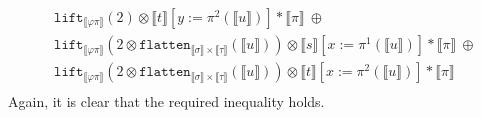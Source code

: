 \documentclass[a4paper,UKenglish,cleveref,autoref,numberwithinsect]{lipics-v2019}
\theoremstyle{definition}
\newcommand{\flatten}{\mathtt{flatten}}
\newcommand{\lift}{\mathtt{lift}}
\newcommand{\typeinterpret}[1]{\llbracket #1 \rrbracket}
\newcommand{\interpret}[1]{\llbracket #1 \rrbracket}
\begin{document}
\begin{itemize}
\[\begin{array}{l}
  \phantom{A}
  \lift_{\typeinterpret{\varphi\pi}}(2) \otimes
    \interpret{t}[y:=\pi^2(\interpret{u})] * \typeinterpret{\pi}\ \oplus\\
  \phantom{A}
  \lift_{\typeinterpret{\varphi\pi}}(2 \otimes
    \flatten_{\typeinterpret{\sigma} \times \typeinterpret{\tau}}(
      \interpret{u})) \otimes \interpret{s}[x:=\pi^1(\interpret{u})]
      * \typeinterpret{\pi}\ \oplus \\
  \phantom{A}
  \lift_{\typeinterpret{\varphi\pi}}(2 \otimes
    \flatten_{\typeinterpret{\sigma} \times \typeinterpret{\tau}}(
      \interpret{u})) \otimes \interpret{t}[x:=\pi^2(\interpret{u})]
      * \typeinterpret{\pi} \\
  \end{array}
  \]
  Again, it is clear that the required inequality holds.


\end{itemize}
\end{document}
